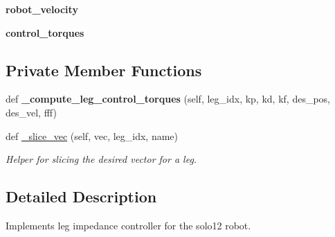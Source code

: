 \begin{DoxyCompactItemize}
\item 
{\bfseries robot\+\_\+velocity}\hypertarget{classpython_1_1dg__tools_1_1leg__impedance__control_1_1solo12__impedance__controller_1_1Solo12ImpedanceController_a1c8c714517fc4d36a177643d161add7d}{}\label{classpython_1_1dg__tools_1_1leg__impedance__control_1_1solo12__impedance__controller_1_1Solo12ImpedanceController_a1c8c714517fc4d36a177643d161add7d}

\item 
{\bfseries control\+\_\+torques}\hypertarget{classpython_1_1dg__tools_1_1leg__impedance__control_1_1solo12__impedance__controller_1_1Solo12ImpedanceController_ae2ef4d7e7f38bce53b931a5d820be71b}{}\label{classpython_1_1dg__tools_1_1leg__impedance__control_1_1solo12__impedance__controller_1_1Solo12ImpedanceController_ae2ef4d7e7f38bce53b931a5d820be71b}

\end{DoxyCompactItemize}
\subsection*{Private Member Functions}
\begin{DoxyCompactItemize}
\item 
def {\bfseries \+\_\+compute\+\_\+leg\+\_\+control\+\_\+torques} (self, leg\+\_\+idx, kp, kd, kf, des\+\_\+pos, des\+\_\+vel, fff)\hypertarget{classpython_1_1dg__tools_1_1leg__impedance__control_1_1solo12__impedance__controller_1_1Solo12ImpedanceController_a75cd13cf011b08ff89edf2342b6fcf38}{}\label{classpython_1_1dg__tools_1_1leg__impedance__control_1_1solo12__impedance__controller_1_1Solo12ImpedanceController_a75cd13cf011b08ff89edf2342b6fcf38}

\item 
def \hyperlink{classpython_1_1dg__tools_1_1leg__impedance__control_1_1solo12__impedance__controller_1_1Solo12ImpedanceController_a0782f26b37ab4ada7b2443685975a673}{\+\_\+slice\+\_\+vec} (self, vec, leg\+\_\+idx, name)
\begin{DoxyCompactList}\small\item\em Helper for slicing the desired vector for a leg. \end{DoxyCompactList}\end{DoxyCompactItemize}


\subsection{Detailed Description}
Implements leg impedance controller for the solo12 robot. 

